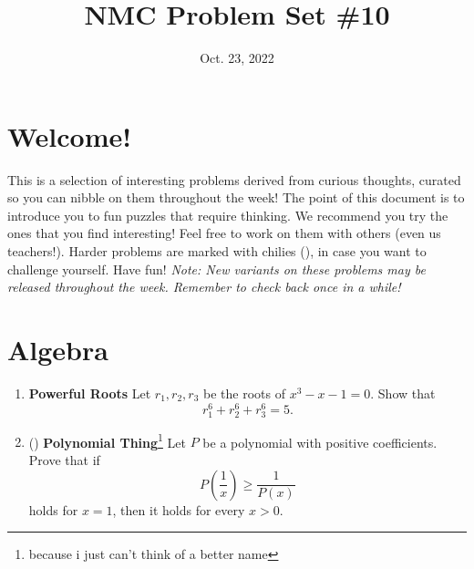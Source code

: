 \documentclass[11pt]{scrartcl}
\begin{document}
\title{NMC Problem Set \#10} %
\date{Oct. 23, 2022} %
\maketitle

\section*{Welcome!}

This is a selection of interesting problems derived from curious thoughts, curated so you can nibble on them throughout the week! The point of this document is to introduce you to fun puzzles that require thinking. We recommend you try the ones that you find interesting! Feel free to work on them with others (even us teachers!). Harder problems are marked with chilies (\fullchili), in case you want to challenge yourself.
\newline\newline
Have fun! \textit{Note: New variants on these problems may be released throughout the week. Remember to check back once in a while!}
    
\section{Algebra}
\begin{enumerate}[label=\textbf{A\arabic*}.]
    \item \textbf{Powerful Roots} \newline
    Let $r_1, r_2, r_3$ be the roots of $x^3 - x - 1 = 0$. Show that
    \[ r_1^6 + r_2^6 + r_3^6 = 5. \]
    
    \item (\fullchili) \textbf{Polynomial Thing}\footnote{because i just can't think of a better name} \newline
    Let $P$ be a polynomial with positive coefficients. Prove that if
    \[ P\left(\frac{1}{x}\right) \geq \frac{1}{P(x)} \]
    holds for $x = 1$, then it holds for every $x > 0$.
\end{enumerate}

\newpage
\end{document}
